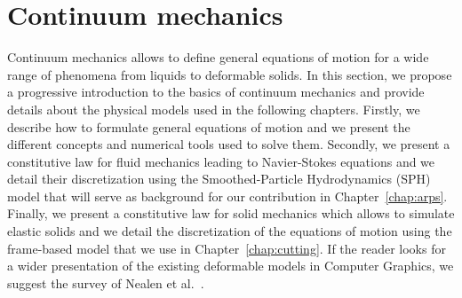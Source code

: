 \section{Continuum mechanics}
\label{sec:continuumMechanics}
Continuum mechanics allows to define general equations of motion for a wide range of phenomena from liquids to deformable solids. 
In this section, we propose a progressive introduction to the basics of continuum mechanics and provide details about the physical models used in the following chapters. 
Firstly, we describe how to formulate general equations of motion and we present the different concepts and numerical tools used to solve them.
Secondly, we present a constitutive law for fluid mechanics leading to Navier-Stokes equations and we detail their discretization using the Smoothed-Particle Hydrodynamics (SPH) model that will serve as background for our contribution in Chapter~\ref{chap:arps}.
Finally, we present a constitutive law for solid mechanics which allows to simulate elastic solids and we detail the discretization of the equations of motion using the frame-based model that we use in Chapter~\ref{chap:cutting}.
If the reader looks for a wider presentation of the existing deformable models in Computer Graphics, we suggest the survey of Nealen et al.~\cite{Nealen2006}.
%
